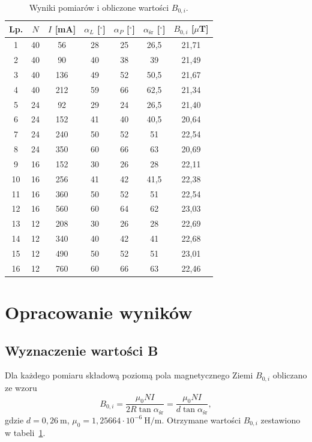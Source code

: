 \documentclass{fizykalab}
\begin{document}
\begin{table}[h!]
  \centering
  \caption{Wyniki pomiarów i obliczone wartości
  \(B_{0,i}\).}
  \label{tab:pomiary}
  \begin{tabular}{ccccccc}
    \hline
    Lp. & \(N\) & \(I\) [mA] & \(\alpha_L\) [\(^\circ\)] &
    \(\alpha_P\) [\(^\circ\)] & \(\alpha_{\text{śr}}\) [\(^\circ\)] &
    \(B_{0,i}\) [\(\mu\)T] \\
    \hline
    1 & 40 &  56 & 28 & 25 & 26{,}5 & 21{,}71 \\
    2 & 40 &  90 & 40 & 38 & 39     & 21{,}49 \\
    3 & 40 & 136 & 49 & 52 & 50{,}5 & 21{,}67 \\
    4 & 40 & 212 & 59 & 66 & 62{,}5 & 21{,}34 \\
    5 & 24 &  92 & 29 & 24 & 26{,}5 & 21{,}40 \\
    6 & 24 & 152 & 41 & 40 & 40{,}5 & 20{,}64 \\
    7 & 24 & 240 & 50 & 52 & 51     & 22{,}54 \\
    8 & 24 & 350 & 60 & 66 & 63     & 20{,}69 \\
    9 & 16 & 152 & 30 & 26 & 28     & 22{,}11 \\
    10 & 16 & 256 & 41 & 42 & 41{,}5 & 22{,}38 \\
    11 & 16 & 360 & 50 & 52 & 51     & 22{,}54 \\
    12 & 16 & 560 & 60 & 64 & 62     & 23{,}03 \\
    13 & 12 & 208 & 30 & 26 & 28     & 22{,}69 \\
    14 & 12 & 340 & 40 & 42 & 41     & 22{,}68 \\
    15 & 12 & 490 & 50 & 52 & 51     & 23{,}01 \\
    16 & 12 & 760 & 60 & 66 & 63     & 22{,}46 \\
    \hline
  \end{tabular}
\end{table}

\pagebreak
\section{Opracowanie wyników}

\subsection{Wyznaczenie wartości B}

Dla każdego pomiaru składową poziomą pola magnetycznego Ziemi
\(B_{0,i}\) obliczano ze wzoru
\begin{equation}
  B_{0,i} = \frac{\mu_0 N I}{2 R \tan\alpha_{\text{śr}}}
  = \frac{\mu_0 N I}{d \tan\alpha_{\text{śr}}},
\end{equation}
gdzie \(d = 0{,}26~\text{m}\), \(\mu_0 = 1{,}25664\cdot 10^{-6}~
\text{H/m}\). Otrzymane wartości \(B_{0,i}\) zestawiono
w tabeli~\ref{tab:pomiary}.
\end{document}
